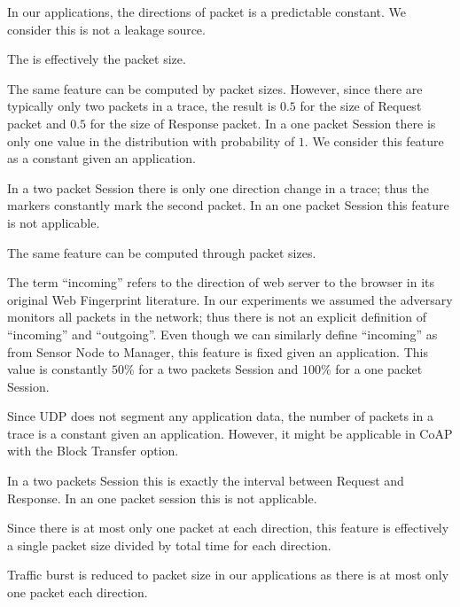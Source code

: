 \begin{description}[style=nextline]
	\item[Direction]
	In our applications, the directions of packet is a predictable constant. We consider this is not a leakage source.
	
	\item[Length]
	The is effectively the packet size.
	
	\item[Frequency Distribution of Length]
	The same feature can be computed by packet sizes. However, since there are typically only two packets in a trace, the result is $0.5$ for the size of Request packet and $0.5$ for the size of Response packet. In a one packet Session there is only one value in the distribution with probability of $1$. We consider this feature as a constant given an application.
	
	\item[Size, HTML and Number Markers]
	In a two packet Session there is only one direction change in a trace; thus the markers constantly mark the second packet. In an one packet Session this feature is not applicable.
	
	\item[Total Bytes]
	The same feature can be computed through packet sizes.
	
	\item[Percentage Incoming Packets]
	The term ``incoming'' refers to the direction of web server to the browser in its original Web Fingerprint literature. In our experiments we assumed the adversary monitors all packets in the network; thus there is not an explicit definition of ``incoming'' and ``outgoing''. Even though we can similarly define ``incoming'' as from Sensor Node to Manager, this feature is fixed given an application. This value is constantly $50\%$ for a two packets Session and $100\%$ for a one packet Session.
	
	\item[Number of Packets]
	Since UDP does not segment any application data, the number of packets in a trace is a constant given an application. However, it might be applicable in CoAP with the Block Transfer option.
	
	\item[Total Time]
	In a two packets Session this is exactly the interval between Request and Response. In an one packet session this is not applicable.
	
	\item[Total Per-direction Bandwidth]
	Since there is at most only one packet at each direction, this feature is effectively a single packet size divided by total time for each direction.
	
	\item[Traffic Burst]
	Traffic burst is reduced to packet size in our applications as there is at most only one packet each direction.
\end{description}

